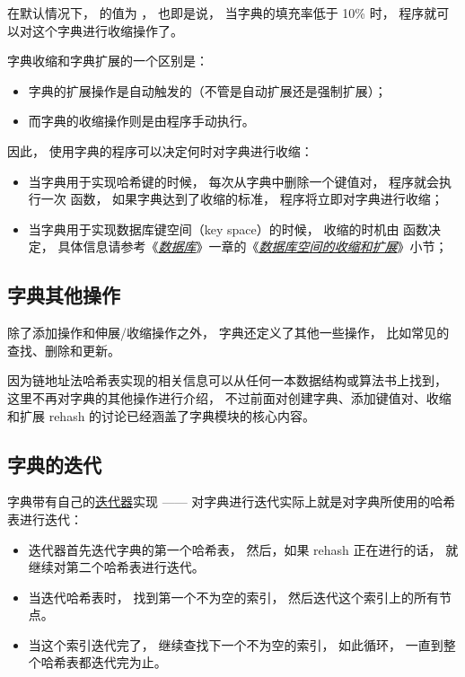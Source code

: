 \documentclass[a4paper,11pt,english]{sphinxmanual}
\begin{document}
在默认情况下，
 的值为  ，
也即是说，
当字典的填充率低于 10\% 时，
程序就可以对这个字典进行收缩操作了。

字典收缩和字典扩展的一个区别是：
\begin{itemize}
\item {} 
字典的扩展操作是自动触发的（不管是自动扩展还是强制扩展）；

\item {} 
而字典的收缩操作则是由程序手动执行。

\end{itemize}

因此，
使用字典的程序可以决定何时对字典进行收缩：
\begin{itemize}
\item {} 
当字典用于实现哈希键的时候，
每次从字典中删除一个键值对，
程序就会执行一次  函数，
如果字典达到了收缩的标准，
程序将立即对字典进行收缩；

\item {} 
当字典用于实现数据库键空间（key space）的时候，
收缩的时机由  函数决定，
具体信息请参考《{\hyperref[internal/db:db-chapter]{\emph{数据库}}}》一章的《{\hyperref[internal/db:db-expand-and-shrink]{\emph{数据库空间的收缩和扩展}}}》小节；

\end{itemize}




\subsection{字典其他操作}
\label{internal-datastruct/dict:id21}
除了添加操作和伸展/收缩操作之外，
字典还定义了其他一些操作，
比如常见的查找、删除和更新。

因为链地址法哈希表实现的相关信息可以从任何一本数据结构或算法书上找到，
这里不再对字典的其他操作进行介绍，
不过前面对创建字典、添加键值对、收缩和扩展 rehash 的讨论已经涵盖了字典模块的核心内容。


\subsection{字典的迭代}
\label{internal-datastruct/dict:id22}
字典带有自己的\href{http://en.wikipedia.org/wiki/Iterator}{迭代器}实现 ——
对字典进行迭代实际上就是对字典所使用的哈希表进行迭代：
\begin{itemize}
\item {} 
迭代器首先迭代字典的第一个哈希表， 然后，如果 rehash 正在进行的话， 就继续对第二个哈希表进行迭代。

\item {} 
当迭代哈希表时， 找到第一个不为空的索引， 然后迭代这个索引上的所有节点。

\item {} 
当这个索引迭代完了， 继续查找下一个不为空的索引， 如此循环， 一直到整个哈希表都迭代完为止。

\end{itemize}
\end{document}
